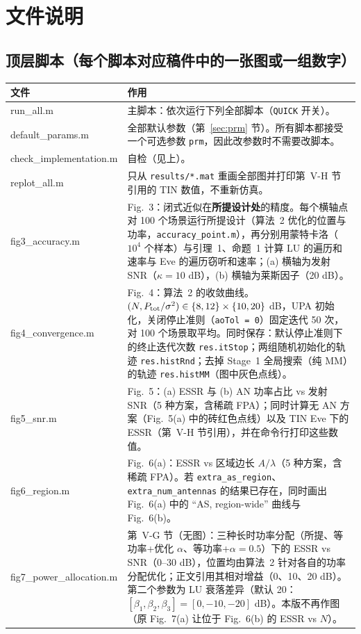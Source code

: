\documentclass[11pt,a4paper]{ctexart}
\newcommand{\code}[1]{\texttt{#1}}
\newcommand{\Ptot}{P_{\rm tot}}
\begin{document}
\section{文件说明}
\subsection{顶层脚本（每个脚本对应稿件中的一张图或一组数字）}
\begin{longtable}{>{\ttfamily\small}p{4.6cm}p{11.2cm}}
\toprule
文件 & 作用 \\ \midrule
run\_all.m & 主脚本：依次运行下列全部脚本（\code{QUICK} 开关）。\\
default\_params.m & 全部默认参数（第~\ref{sec:prm} 节）。所有脚本都接受一个可选参数 \code{prm}，因此改参数时不需要改脚本。\\
check\_implementation.m & 自检（见上）。\\
replot\_all.m & 只从 \code{results/*.mat} 重画全部图并打印第~V-H 节引用的 TIN 数值，不重新仿真。\\ \midrule
fig3\_accuracy.m & Fig.~3：闭式近似在\textbf{所提设计处}的精度。每个横轴点对 100 个场景运行所提设计（算法~2 优化的位置与功率，\code{accuracy\_point.m}），再分别用蒙特卡洛（$10^4$ 个样本）与引理~1、命题~1 计算 LU 的遍历和速率与 Eve 的遍历窃听和速率；(a) 横轴为发射 SNR（$\kappa=10$ dB），(b) 横轴为莱斯因子（20 dB）。\\
fig4\_convergence.m & Fig.~4：算法~2 的收敛曲线。$(N,\Ptot/\sigma^2)\in\{8,12\}\times\{10,20\}$ dB，UPA 初始化，关闭停止准则（\code{aoTol = 0}）固定迭代 50 次，对 100 个场景取平均。同时保存：默认停止准则下的终止迭代次数 \code{res.itStop}；两组随机初始化的轨迹 \code{res.histRnd}；去掉 Stage~1 全局搜索（纯 MM）的轨迹 \code{res.histMM}（图中灰色点线）。\\
fig5\_snr.m & Fig.~5：(a) ESSR 与 (b) AN 功率占比 vs 发射 SNR（5 种方案，含稀疏 FPA）；同时计算无 AN 方案（Fig.~5(a) 中的砖红色点线）以及 TIN Eve 下的 ESSR（第~V-H 节引用），并在命令行打印这些数值。\\
fig6\_region.m & Fig.~6(a)：ESSR vs 区域边长 $A/\lambda$（5 种方案，含稀疏 FPA）。若 \code{extra\_as\_region}、\code{extra\_num\_antennas} 的结果已存在，同时画出 Fig.~6(a) 中的 “AS, region-wide” 曲线与 Fig.~6(b)。\\
fig7\_power\_allocation.m & 第~V-G 节（无图）：三种长时功率分配（所提、等功率+优化 $\alpha$、等功率+$\alpha=0.5$）下的 ESSR vs SNR（0--30 dB），位置均由算法~2 针对各自的功率分配优化；正文引用其相对增益（0、10、20 dB）。第二个参数为 LU 衰落差异（默认 20：$[\beta_1,\beta_2,\beta_3]=[0,-10,-20]$ dB）。本版不再作图（原 Fig.~7(a) 让位于 Fig.~6(b) 的 ESSR vs $N$）。\\ \midrule

\end{longtable}
\end{document}
